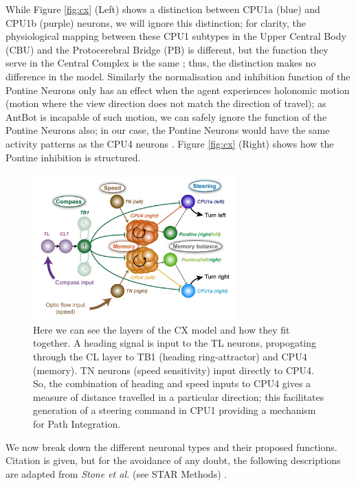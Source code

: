\documentclass[a4paper,11pt,twoside,openright]{article}
\begin{document}
While Figure \ref{fig:cx} (Left) shows a distinction between CPU1a (blue) and
CPU1b (purple) neurons, we will ignore this distinction; for clarity, the
physiological mapping between these CPU1 subtypes in the Upper Central Body (CBU)
and the Protocerebral Bridge (PB) is different, but the function they serve in
the Central Complex is the same \cite{Stone2017}; thus, the distinction makes
no difference in the model. Similarly the normalisation and inhibition function
of the Pontine Neurons only has an effect when the agent experiences holonomic
motion (motion where the view direction does not match the direction of travel);
as AntBot is incapable of such motion, we can safely ignore the function of
the Pontine Neurons also; in our case, the Pontine Neurons would have the
same activity patterns as the CPU4 neurons \cite{Stone2017}. Figure \ref{fig:cx}
(Right) shows how the Pontine inhibition is structured.
\newline
\par

\begin{figure}[h!]
  \centering
  \includegraphics[width=0.7\textwidth]{Figure5F}
  \caption{
    \label{fig:cxlayer} Here we can see the layers of the CX model and
    how they fit together. A heading signal is input to the TL neurons,
    propogating through the CL layer to TB1 (heading ring-attractor) and
    CPU4 (memory). TN neurons (speed sensitivity) input directly to CPU4.
    So, the combination of heading and speed inputs to CPU4 gives a measure
    of distance travelled in a particular direction; this facilitates generation
    of a steering command in CPU1 providing a mechanism for Path Integration.
  }
\end{figure}

We now break down the different neuronal types and their proposed functions.
Citation is given, but for the avoidance of any doubt, the following descriptions
are adapted from \textit{Stone et al.} (see STAR Methods) \cite{Stone2017}.
\end{document}
